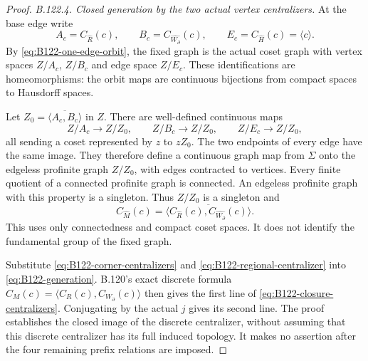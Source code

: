 \begin{proof}
\emph{B.122.4. Closed generation by the two actual vertex centralizers.}
At the base edge write
\[
 A_c=C_{\widehat R}(c),\qquad
 B_c=C_{\widehat{W_{\partial}}}(c),\qquad
 E_c=C_{\widehat H}(c)=\langle c\rangle.
\]
By \eqref{eq:B122-one-edge-orbit}, the fixed graph is the actual
coset graph with vertex spaces $Z/A_c$, $Z/B_c$ and edge space
$Z/E_c$. These identifications are homeomorphisms: the orbit
maps are continuous bijections from compact spaces to Hausdorff
spaces.

Let $Z_0=\overline{\langle A_c,B_c\rangle}$ in $Z$.
There are well-defined continuous maps
\[
 Z/A_c\longrightarrow Z/Z_0,\qquad
 Z/B_c\longrightarrow Z/Z_0,\qquad
 Z/E_c\longrightarrow Z/Z_0,
\]
all sending a coset represented by $z$ to $zZ_0$. The two
endpoints of every edge have the same image. They therefore
define a continuous graph map from $\Sigma$ onto the edgeless
profinite graph $Z/Z_0$, with edges contracted to vertices.
Every finite quotient of a connected profinite graph is connected.
An edgeless profinite graph with this property is a singleton.
Thus $Z/Z_0$ is a singleton and
\begin{equation}\label{eq:B122-generation}
 C_{\widehat M}(c)=\overline{\langle
                 C_{\widehat R}(c),
                 C_{\widehat{W_{\partial}}}(c)\rangle}.
\end{equation}
This uses only connectedness and compact coset spaces. It does
not identify the fundamental group of the fixed graph.

Substitute \eqref{eq:B122-corner-centralizers} and
\eqref{eq:B122-regional-centralizer} into
\eqref{eq:B122-generation}. B.120's exact discrete formula
$C_M(c)=\langle C_R(c),C_{W_{\partial}}(c)\rangle$
then gives the first line of
\eqref{eq:B122-closure-centralizers}. Conjugating by the actual
$j$ gives its second line. The proof establishes the closed image
of the discrete centralizer, without assuming that this discrete
centralizer has its full induced topology. It makes no assertion
after the four remaining prefix relations are imposed.
\end{proof}
